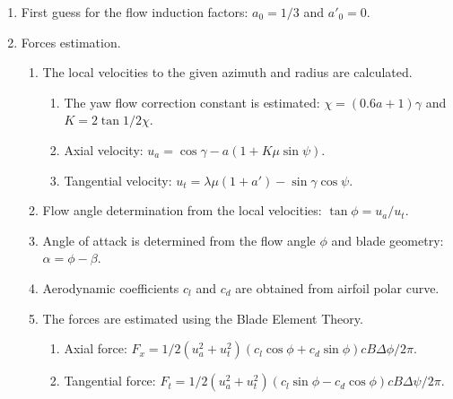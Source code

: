 \begin{enumerate}
	
	\item First guess for the flow induction factors: $ a_0 = 1/3 $ and $ a'_0 = 0 $.
	
	\item \label{iteration-start} Forces estimation.
	
	\begin{enumerate}
		
		\item The local velocities to the given azimuth and radius are calculated.
		
		\begin{enumerate}
			
			\item The yaw flow correction constant is estimated: $ \chi = (0.6 a + 1) \gamma $ and $ K = 2 \tan 1/2 \chi $.
			
			\item Axial velocity: $ u_a = \cos \gamma - a (1 + K \mu \sin \psi) $.
			
			\item Tangential velocity: $ u_t = \lambda \mu (1+a') - \sin \gamma \cos \psi $.
			
		\end{enumerate}
		
		\item Flow angle determination from the local velocities: $ \tan \phi = u_a/u_t $.
		
		\item Angle of attack is determined from the flow angle $ \phi $ and blade geometry: $ \alpha = \phi - \beta $.
		
		\item Aerodynamic coefficients $ c_l $ and $ c_d $ are obtained from airfoil polar curve.
		
		\item The forces are estimated using the Blade Element Theory.
		
		\begin{enumerate}
			
			\item Axial force: $ F_x = 1/2 (u_a^2+u_t^2) (c_l \cos \phi + c_d \sin \phi) c B \Delta \phi / 2 \pi $.
			
			\item Tangential force: $ F_t = 1/2 (u_a^2+u_t^2) (c_l \sin \phi - c_d \cos \phi) c B \Delta \psi / 2 \pi $.
			
		\end{enumerate}
		

\end{enumerate}
\end{enumerate}
